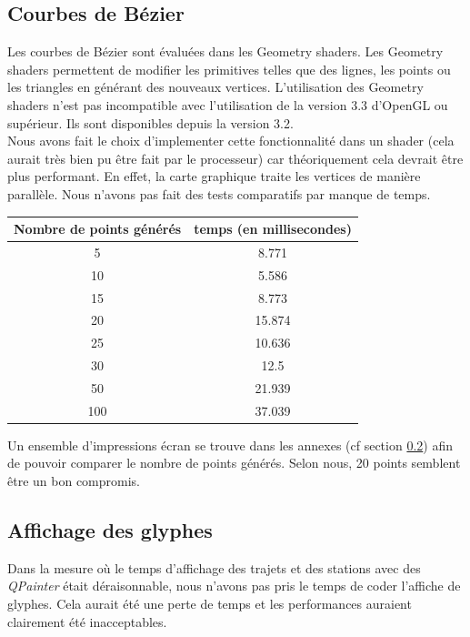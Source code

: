 \documentclass[12pt]{article}
\begin{document}
	    \subsection{Courbes de Bézier}
		Les courbes de Bézier sont évaluées dans les Geometry shaders. Les Geometry shaders
		permettent de modifier les primitives telles que des lignes, les points ou les triangles
		en générant des nouveaux vertices. L'utilisation des Geometry shaders n'est pas incompatible
		avec l'utilisation de la version 3.3 d'OpenGL ou supérieur. Ils sont disponibles depuis la 
		version 3.2.\\
		Nous avons fait le choix d'implementer cette 
		fonctionnalité dans un shader (cela aurait très bien pu être fait par le processeur)
		car théoriquement cela devrait être plus performant. En effet, la carte graphique
		traite les vertices de manière parallèle. Nous n'avons pas fait des tests
		comparatifs par manque de temps.\\
	    
		\begin{center}
			\begin{tabular}{| c | c |}
			\hline
			\textbf{Nombre de points générés} & \textbf{temps (en millisecondes)}\\ \hline
			5  &  8.771 \\ \hline
			10 &  5.586 \\ \hline
			15 &  8.773 \\ \hline
			20 &  15.874 \\ \hline
			25 &  10.636 \\ \hline
			30 &  12.5 \\ \hline
			50 &  21.939\\ \hline
			100 &  37.039 \\ \hline
		    \end{tabular}
	    \end{center}
	    
	    Un ensemble d'impressions écran se trouve dans les annexes (cf section \ref{}) afin
	    de pouvoir comparer le nombre de points générés. Selon nous, 20 points semblent être
	    un bon compromis.\\
	    
		\subsection{Affichage des glyphes}
		Dans la mesure où le temps d'affichage des trajets et des stations avec des \textit{QPainter}
		était déraisonnable, nous n'avons pas pris le temps de coder l'affiche de glyphes. Cela aurait été 
		une perte de temps et les performances auraient clairement été inacceptables.
		
\end{document}
